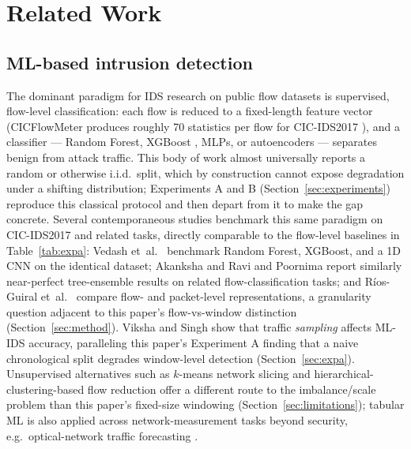 \documentclass[twocolumn]{llncs}
\begin{document}
\section{Related Work}
\label{sec:related}

\subsection{ML-based intrusion detection}

The dominant paradigm for IDS research on public flow datasets is supervised, flow-level
classification: each flow is reduced to a fixed-length feature vector (CICFlowMeter produces
roughly 70 statistics per flow for CIC-IDS2017 \cite{sharafaldin2018cicids2017}), and a classifier
--- Random Forest, XGBoost \cite{chen2016xgboost}, MLPs, or autoencoders --- separates benign from
attack traffic. This body of work almost universally reports a random or otherwise i.i.d.\ split,
which by construction cannot expose degradation under a shifting distribution; Experiments A and B
(Section~\ref{sec:experiments}) reproduce this classical protocol and then depart from it to make
the gap concrete. Several contemporaneous studies benchmark this same paradigm on CIC-IDS2017 and
related tasks, directly comparable to the flow-level baselines in Table~\ref{tab:expa}: Vedash
et~al.\ \cite{vedash2026xai} benchmark Random Forest, XGBoost, and a 1D CNN on the identical
dataset; Akanksha \cite{akanksha2025malware} and Ravi and Poornima \cite{ravi2025flowmetadata}
report similarly near-perfect tree-ensemble results on related flow-classification tasks; and
R{\'i}os-Guiral et~al.\ \cite{riosguiral2024flowspackets} compare flow- and packet-level
representations, a granularity question adjacent to this paper's flow-vs-window distinction
(Section~\ref{sec:method}). Viksha and Singh \cite{viksha2024sampling} show that traffic
\emph{sampling} affects ML-IDS accuracy, paralleling this paper's Experiment A finding that a naive
chronological split degrades window-level detection (Section~\ref{sec:expa}). Unsupervised
alternatives such as $k$-means network slicing \cite{aouedi2021unsupervised} and
hierarchical-clustering-based flow reduction \cite{su2018hierarchical} offer a different route to
the imbalance/scale problem than this paper's fixed-size windowing (Section~\ref{sec:limitations});
tabular ML is also applied across network-measurement tasks beyond security, e.g.\ optical-network
traffic forecasting \cite{szostak2020lda}.
\end{document}
